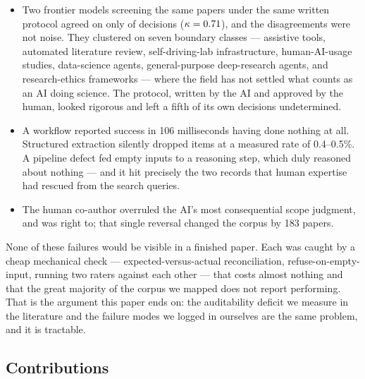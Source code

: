\begin{itemize}\itemsep2pt
\item Two frontier models screening the same \nScreened{} papers under the same written
protocol agreed on only \rawAgree{} of decisions ($\kappa = 0.71{}$), and the
disagreements were not noise. They clustered on seven boundary classes --- assistive tools,
automated literature review, self-driving-lab infrastructure, human-AI-usage studies,
data-science agents, general-purpose deep-research agents, and research-ethics frameworks ---
where the field has not settled what counts as an AI doing science. The protocol, written by
the AI and approved by the human, looked rigorous and left a fifth of its own decisions
undetermined.

\item A workflow reported success in 106 milliseconds having done nothing at all. Structured
extraction silently dropped items at a measured rate of 0.4--0.5\%. A pipeline defect fed
empty inputs to a reasoning step, which duly reasoned about nothing --- and it hit precisely
the two records that human expertise had rescued from the search queries.

\item The human co-author overruled the AI's most consequential scope judgment, and was
right to; that single reversal changed the corpus by 183 papers.
\end{itemize}

None of these failures would be visible in a finished paper. Each was caught by a cheap
mechanical check --- expected-versus-actual reconciliation, refuse-on-empty-input, running
two raters against each other --- that costs almost nothing and that the great majority of
the corpus we mapped does not report performing. That is the argument this paper ends on:
the auditability deficit we measure in the literature and the failure modes we logged in
ourselves are the same problem, and it is tractable.

\subsection*{Contributions}

